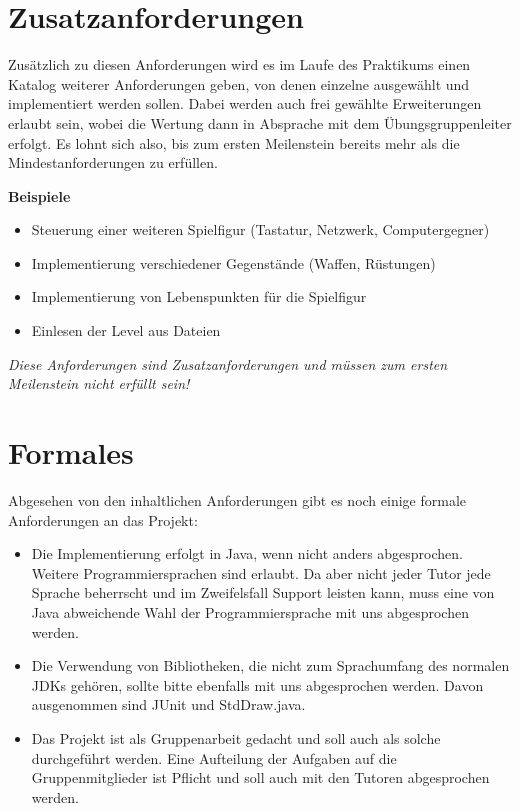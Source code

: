 \documentclass{programmierpraktikum}
\begin{document}
\section{Zusatzanforderungen}
Zusätzlich zu diesen Anforderungen wird es im Laufe des Praktikums einen Katalog weiterer
Anforderungen geben, von denen einzelne ausgewählt und implementiert werden sollen. Dabei werden
auch frei gewählte Erweiterungen erlaubt sein, wobei die Wertung dann in Absprache mit dem
Übungsgruppenleiter erfolgt. Es lohnt sich also, bis zum ersten Meilenstein bereits mehr als die
Mindestanforderungen zu erfüllen.

\textbf{Beispiele}
\begin{itemize}
  \item Steuerung einer weiteren Spielfigur (Tastatur, Netzwerk, Computergegner)
  \item Implementierung verschiedener Gegenstände (Waffen, Rüstungen)
  \item Implementierung von Lebenspunkten für die Spielfigur
  \item Einlesen der Level aus Dateien
\end{itemize}
\emph{Diese Anforderungen sind Zusatzanforderungen und müssen zum ersten Meilenstein nicht erfüllt sein!}
%
\section{Formales}
Abgesehen von den inhaltlichen Anforderungen gibt es noch einige formale Anforderungen an das Projekt:
\begin{itemize}
  \item Die Implementierung erfolgt in Java, wenn nicht anders abgesprochen. Weitere
    Programmiersprachen sind erlaubt. Da aber nicht jeder Tutor jede Sprache beherrscht und im
    Zweifelsfall Support leisten kann, muss eine von Java abweichende Wahl der Programmiersprache
    mit uns abgesprochen werden.
  \item Die Verwendung von Bibliotheken, die nicht zum Sprachumfang des normalen JDKs gehören,
    sollte bitte ebenfalls mit uns abgesprochen werden. Davon ausgenommen sind JUnit und
    StdDraw.java.
  \item Das Projekt ist als Gruppenarbeit gedacht und soll auch als solche durchgeführt werden.
    Eine Aufteilung der Aufgaben auf die Gruppenmitglieder ist Pflicht und soll auch mit den
    Tutoren abgesprochen werden.
\end{itemize}
%
\end{document}
